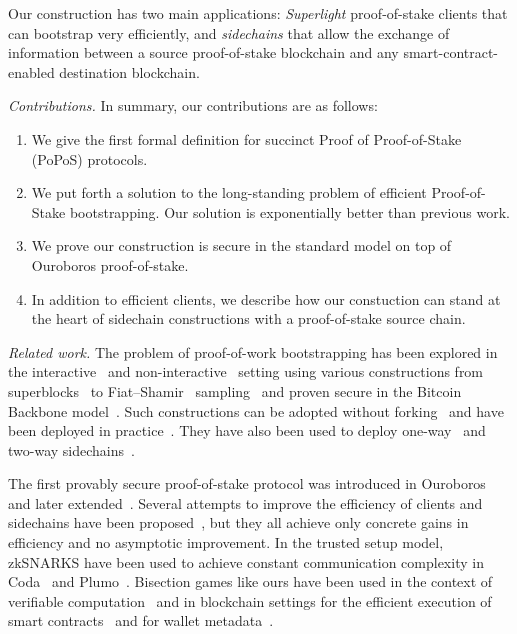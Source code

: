 Our construction has two main applications: \emph{Superlight} proof-of-stake clients that can
bootstrap very efficiently, and \emph{sidechains} that allow the exchange of information between
a source proof-of-stake blockchain and any smart-contract-enabled destination blockchain.

\noindent
\emph{Contributions.} In summary, our contributions are as follows:

\begin{enumerate}
  \item We give the first formal definition for succinct Proof of Proof-of-Stake (PoPoS) protocols.
  \item We put forth a solution to the long-standing problem of efficient Proof-of-Stake bootstrapping.
        Our solution is exponentially better than previous work.
  \item We prove our construction is secure in the standard model on top of Ouroboros proof-of-stake.
  \item In addition to efficient clients, we describe how our constuction can stand at the heart of
        sidechain constructions with a proof-of-stake source chain.
\end{enumerate}

\noindent
\emph{Related work.} The problem of proof-of-work bootstrapping has been explored in the interactive~\cite{popow}
and non-interactive~\cite{nipopows} setting using various constructions from superblocks~\cite{logspace,compactsuperblocks}
to Fiat--Shamir~\cite{fiatshamir} sampling~\cite{flyclient} and proven secure in the Bitcoin Backbone
model~\cite{backbone,backbone-new,varbackbone}. Such constructions can be adopted without
forking~\cite{velvet,velvet-nipopows} and have been deployed in practice~\cite{gas-efficient}. They have
also been used to deploy one-way~\cite{burn} and two-way sidechains~\cite{sidechains,pow-sidechains,crosschain-sok}.

The first provably secure proof-of-stake protocol was introduced in
Ouroboros~\cite{ouroboros} and later extended~\cite{praos,genesis}. Several attempts to improve the efficiency
of clients and sidechains have been proposed~\cite{pos-sidechains,mithril}, but they all achieve only concrete gains in efficiency
and no asymptotic improvement. In the trusted setup model, zkSNARKS have been used to achieve constant communication complexity
in Coda~\cite{coda} and Plumo~\cite{plumo}.
Bisection games like ours have been used in the context of verifiable computation~\cite{refereed-computation}
and in blockchain settings for the efficient execution of smart contracts~\cite{arbitrum}
and for wallet metadata~\cite{wallets}.

